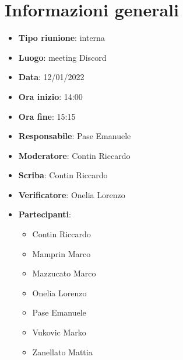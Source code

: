\section{Informazioni generali}
\begin{itemize}
  \item \textbf{Tipo riunione}: interna
  \item \textbf{Luogo}: meeting Discord
  \item \textbf{Data}: 12/01/2022
  \item \textbf{Ora inizio}: 14:00
  \item \textbf{Ora fine}: 15:15
  \item \textbf{Responsabile}: Pase Emanuele
  \item \textbf{Moderatore}: Contin Riccardo
  \item \textbf{Scriba}: Contin Riccardo
  \item \textbf{Verificatore}: Onelia Lorenzo
  \item \textbf{Partecipanti}:
  \begin{itemize}
    \item Contin Riccardo
    \item Mamprin Marco
    \item Mazzucato Marco
    \item Onelia Lorenzo
    \item Pase Emanuele
    \item Vukovic Marko
    \item Zanellato Mattia
  \end{itemize}
\end{itemize}
